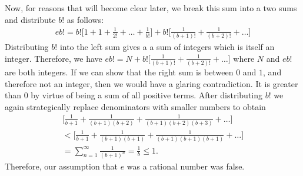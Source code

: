 \documentclass[12pt,oneside]{amsart}
\theoremstyle{definition}
\theoremstyle{remark}
\numberwithin{equation}{exer}
\begin{document}
\indent Now, for reasons that will become clear later, we break this sum into a two sums and distribute $b!$ as follows:
\begin{align*}
    eb!=b!\Big[1+1+ \frac{1}{2!}+\ldots+\frac{1}{b!}\Big]+b!\Big[\frac{1}{(b+1)!}+\frac{1}{(b+2)!}+\ldots \Big]
\end{align*}
Distributing $b!$ into the left sum gives a a sum of integers which is itself an integer. Therefore, we have $eb!=N +b!\Big[\frac{1}{(b+1)!}+\frac{1}{(b+2)!}+\ldots \Big] $ where $N$ and $eb!$ are both integers. \newline
\indent If we can show that the right sum is between $0$ and $1$, and therefore not an integer, then we would have a glaring contradiction. It is greater than $0$ by virtue of being a sum of all positive terms. After distributing $b!$ we again strategically replace denominators with smaller numbers to obtain 
\begin{align*}
    \Big[\frac{1}{b+1}+\frac{1}{(b+1)(b+2)}+ \frac{1}{(b+1)(b+2)(b+3)}+\ldots\Big]\\ < \Big[\frac{1}{b+1}+\frac{1}{(b+1)(b+1)}+ \frac{1}{(b+1)(b+1)(b+1)}+\ldots\Big]\\ = \sum_{n=1}^{\infty}\frac{1}{(b+1)^n} = \frac{1}{b} \leq 1.
\end{align*}
Therefore, our assumption that $e$ was a rational number was false. 
\end{document}
